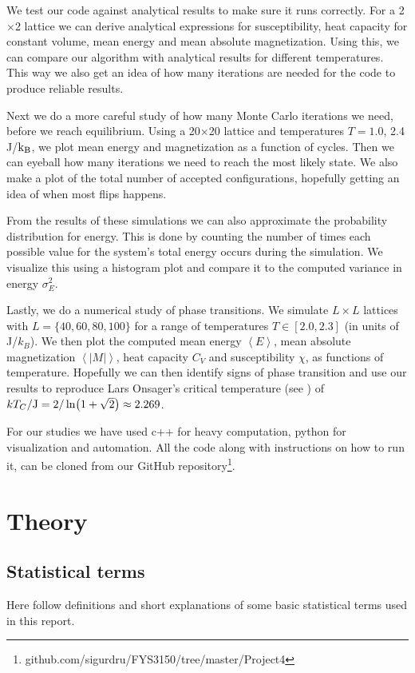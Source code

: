 \documentclass[reprint, english,notitlepage,nofootinbib]{revtex4-1}  %
\begin{document}
We test our code against analytical results to make sure it runs correctly. For a 2$\times$2 lattice we can derive analytical expressions for susceptibility, heat capacity for constant volume, mean energy and mean absolute magnetization. Using this, we can compare our algorithm with analytical results for different temperatures. This way we also get an idea of how many iterations are needed for the code to produce reliable results.

Next we do a more careful study of how many Monte Carlo iterations we need, before we reach equilibrium. Using a 20$\times$20 lattice and temperatures $T = 1.0$, 2.4 J/$\rm k_B$, we plot mean energy and magnetization as a function of cycles. Then we can eyeball how many iterations we need to reach the most likely state. We also make a plot of the total number of accepted configurations, hopefully getting an idea of when most flips happens.

From the results of these simulations we can also approximate the probability distribution for energy. This is done by counting the number of times each possible value for the system's total energy occurs during the simulation. We visualize this using a histogram plot and compare it to the computed variance in energy $\sigma_E^2$.

Lastly, we do a numerical study of phase transitions. We simulate $L \times L$ lattices with $L = \{40, 60, 80, 100\}$ for a range of temperatures $T\in[2.0,2.3]$ (in units of J/$k_B$). We then plot the computed mean energy $\left<E\right>$, mean absolute magnetization $\left<|M|\right>$, heat capacity $C_V$ and susceptibility $\chi$, as functions of temperature. Hopefully we can then identify signs of phase transition and use our results to reproduce Lars Onsager's critical temperature (see \cite{larsonsager}) of $kT_C/\rm{J}=2/\ln(1+\sqrt{2})\approx2.269$.

For our studies we have used c++ for heavy computation, python for visualization and automation. All the code along with instructions on how to run it, can be cloned from our GitHub repository\footnote{github.com/sigurdru/FYS3150/tree/master/Project4}.

\section{Theory}

\subsection*{Statistical terms}
Here follow definitions and short explanations of some basic statistical terms used in this report.
\end{document}
